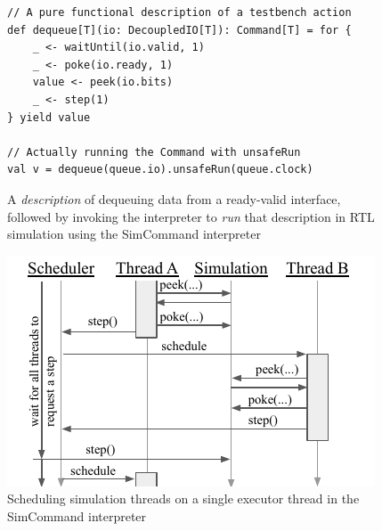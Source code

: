 \documentclass[sigplan,review,nonacm,9pt]{acmart}
\begin{document}
\begin{figure}
\begin{verbatim}
// A pure functional description of a testbench action
def dequeue[T](io: DecoupledIO[T]): Command[T] = for {
    _ <- waitUntil(io.valid, 1)
    _ <- poke(io.ready, 1)
    value <- peek(io.bits)
    _ <- step(1)
} yield value

// Actually running the Command with unsafeRun
val v = dequeue(queue.io).unsafeRun(queue.clock)
\end{verbatim}
\caption{A \textit{description} of dequeuing data from a ready-valid interface, followed by invoking the interpreter to \textit{run} that description in RTL simulation using the SimCommand interpreter}
\label{fig:simcommand}
\end{figure}

\begin{figure}
\includegraphics[scale=1]{simcommand/scheduler.pdf}
\caption{Scheduling simulation threads on a single executor thread in the SimCommand interpreter}
\label{fig:simcommand_interp}
\end{figure}
\end{document}
